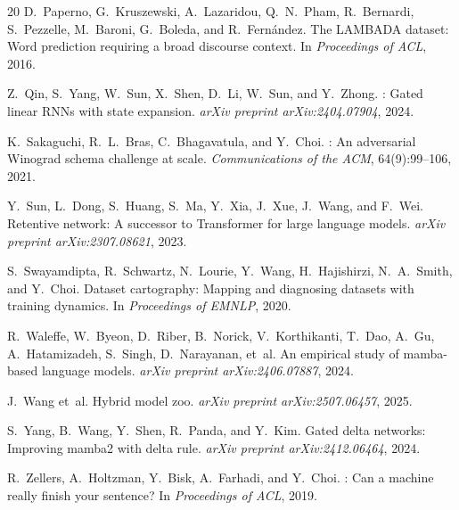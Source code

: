 \documentclass[11pt]{article}
\begin{document}
\begin{thebibliography}{20}
D.~Paperno, G.~Kruszewski, A.~Lazaridou, Q.~N.~Pham, R.~Bernardi, S.~Pezzelle, M.~Baroni, G.~Boleda, and R.~Fern\'{a}ndez.
\newblock The {LAMBADA} dataset: Word prediction requiring a broad discourse context.
\newblock In \emph{Proceedings of ACL}, 2016.

Z.~Qin, S.~Yang, W.~Sun, X.~Shen, D.~Li, W.~Sun, and Y.~Zhong.
: Gated linear {RNN}s with state expansion.
\newblock \emph{arXiv preprint arXiv:2404.07904}, 2024.

K.~Sakaguchi, R.~L.~Bras, C.~Bhagavatula, and Y.~Choi.
: An adversarial {Winograd} schema challenge at scale.
\newblock \emph{Communications of the ACM}, 64(9):99--106, 2021.

Y.~Sun, L.~Dong, S.~Huang, S.~Ma, Y.~Xia, J.~Xue, J.~Wang, and F.~Wei.
\newblock Retentive network: A successor to {Transformer} for large language models.
\newblock \emph{arXiv preprint arXiv:2307.08621}, 2023.

S.~Swayamdipta, R.~Schwartz, N.~Lourie, Y.~Wang, H.~Hajishirzi, N.~A.~Smith, and Y.~Choi.
\newblock Dataset cartography: Mapping and diagnosing datasets with training dynamics.
\newblock In \emph{Proceedings of EMNLP}, 2020.

R.~Waleffe, W.~Byeon, D.~Riber, B.~Norick, V.~Korthikanti, T.~Dao, A.~Gu, A.~Hatamizadeh, S.~Singh, D.~Narayanan, et~al.
\newblock An empirical study of mamba-based language models.
\newblock \emph{arXiv preprint arXiv:2406.07887}, 2024.

J.~Wang et~al.
\newblock Hybrid model zoo.
\newblock \emph{arXiv preprint arXiv:2507.06457}, 2025.

S.~Yang, B.~Wang, Y.~Shen, R.~Panda, and Y.~Kim.
\newblock Gated delta networks: Improving mamba2 with delta rule.
\newblock \emph{arXiv preprint arXiv:2412.06464}, 2024.

R.~Zellers, A.~Holtzman, Y.~Bisk, A.~Farhadi, and Y.~Choi.
: Can a machine really finish your sentence?
\newblock In \emph{Proceedings of ACL}, 2019.

\end{thebibliography}
\end{document}
